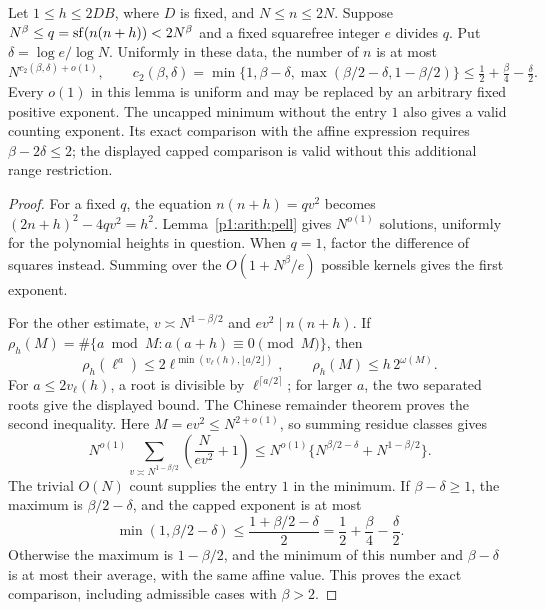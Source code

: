 \begin{lemma}
\label{p13:short:quadratic}
Let \(1\le h\le2DB\), where \(D\) is fixed, and \(N\le n\le2N\).
Suppose \(N^\beta\le q=\sf(n(n+h))<2N^\beta\) and a fixed squarefree
integer \(e\) divides \(q\). Put \(\delta=\log e/\log N\).
Uniformly in these data, the number of \(n\) is at most
\[
 N^{c_2(\beta,\delta)+o(1)},\qquad
 c_2(\beta,\delta)=
 \min\{1,\beta-\delta,\max(\beta/2-\delta,1-\beta/2)\}
 \le \tfrac12+\tfrac\beta4-\tfrac\delta2.
\]
Every \(o(1)\) in this lemma is uniform and may be replaced
by an arbitrary fixed positive exponent.
The uncapped minimum without the entry \(1\) also gives a valid
counting exponent.  Its exact comparison with the affine expression
requires \(\beta-2\delta\le2\); the displayed capped comparison is
valid without this additional range restriction.
\end{lemma}

\begin{proof}
For a fixed \(q\), the equation \(n(n+h)=qv^2\) becomes
\((2n+h)^2-4qv^2=h^2\). Lemma~\ref{p1:arith:pell}
gives \(N^{o(1)}\) solutions, uniformly for the polynomial
heights in question. When \(q=1\), factor the difference of
squares instead. Summing over the \(O(1+N^\beta/e)\)
possible kernels gives the first exponent.

For the other estimate, \(v\asymp N^{1-\beta/2}\) and
\(ev^2\mid n(n+h)\). If
\(\rho_h(M)=\#\{a\bmod M:a(a+h)\equiv0\pmod M\}\), then
\[
 \rho_h(\ell^a)
 \le2\ell^{\min(v_\ell(h),\lfloor a/2\rfloor)},\qquad
 \rho_h(M)\le h\,2^{\omega(M)}.
\]
For \(a\le2v_\ell(h)\), a root is divisible by
\(\ell^{\lceil a/2\rceil}\); for larger \(a\), the two
separated roots give the displayed bound. The Chinese
remainder theorem proves the second inequality. Here
\(M=ev^2\le N^{2+o(1)}\), so summing residue classes gives
\[
 N^{o(1)}
 \sum_{v\asymp N^{1-\beta/2}}\left(\frac{N}{ev^2}+1\right)
 \le N^{o(1)}
       \{N^{\beta/2-\delta}+N^{1-\beta/2}\}.
\]
The trivial \(O(N)\) count supplies the entry \(1\) in the
minimum.  If \(\beta-\delta\ge1\), the maximum is
\(\beta/2-\delta\), and the capped exponent is at most
\[
 \min(1,\beta/2-\delta)
 \le \frac{1+\beta/2-\delta}{2}
 =\frac12+\frac\beta4-\frac\delta2.
\]
Otherwise the maximum is \(1-\beta/2\), and the minimum of this
number and \(\beta-\delta\) is at most their average, with the
same affine value.  This proves the exact comparison, including
admissible cases with \(\beta>2\).
\end{proof}

